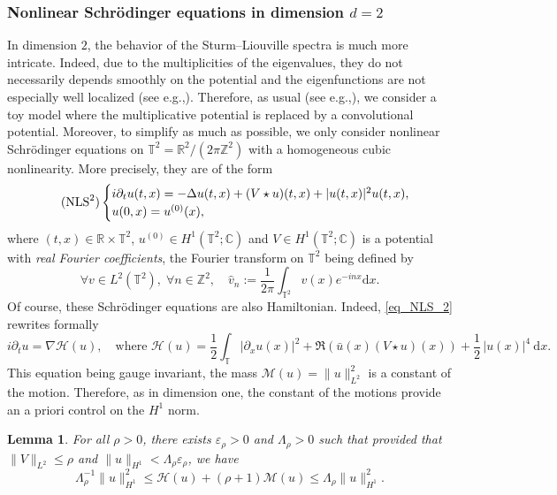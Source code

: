 \documentclass[11pt]{article}
\newcommand{\eg}{e.g.,\xspace}
\newtheorem{lemma}[theorem]{Lemma}
\theoremstyle{definition}
\begin{document}
\subsubsection{Nonlinear Schrödinger equations in dimension $d=2$}
\label{sub_sec_NLS2}
In dimension $2$, the behavior of the Sturm--Liouville spectra is much more intricate. Indeed, due to the multiplicities of the eigenvalues, they do not necessarily depends smoothly on the potential and the eigenfunctions are not especially well localized (see \eg \cite{BB13}). Therefore, as usual (see \eg \cite{BG06,FI19,BMP20}), we consider a toy model where the multiplicative potential is replaced by a convolutional potential. Moreover, to simplify as much as possible, we only consider nonlinear Schrödinger equations on $\mathbb{T}^2 = \mathbb{R}^2 / (2\pi \mathbb{Z}^2)$ with a homogeneous cubic nonlinearity. More precisely, they are of the form
\begin{equation}
\label{eq_NLS_2}
\tag{$\mathrm{NLS}^2$}
\begin{cases}
i\partial_t u(t,x) = -\Delta u(t,x) +(V \star u)(t,x) + |u(t,x)|^2 u(t,x), \\
u(0,x) = u^{(0)}(x),
\end{cases}
\end{equation}
where $(t,x)\in \mathbb{R}\times\mathbb{T}^2$, $u^{(0)}\in H^1(\mathbb{T}^2;\mathbb{C})$ and $V \in H^1(\mathbb{T}^2 ; \mathbb{C})$ is a potential with \emph{real Fourier coefficients}, the Fourier transform on $\mathbb{T}^2$ being defined by
\[
\forall v\in L^2(\mathbb{T}^2),\;\forall n \in \mathbb{Z}^2, \quad \widehat{v}_n:= \frac1{2\pi} \int_{\mathbb{T}^2} v(x) e^{-inx}\mathrm{d}x.
\]
Of course, these Schrödinger equations are also Hamiltonian. Indeed, \eqref{eq_NLS_2} rewrites formally
\[
i\partial_t u = \nabla \mathcal{H}(u), \quad \text{where } \mathcal{H}(u) =\frac12 \int_{\mathbb{T}} |\partial_x u(x) |^2 + \Re (\bar{u}(x)(V \star u)(x)) + \frac12\, |u(x)|^4 \ \mathrm{d}x.
\]
This equation being gauge invariant, the mass $\mathcal{M}(u) = \|u\|_{L^2}^2$ is a constant of the motion. Therefore, as in dimension one, the constant of the motions provide an a priori control on the $H^1$ norm.
\begin{lemma} \label{lemma_Lag_NLS_coer_2d} For all $\rho>0$, there exists $\varepsilon_\rho >0$ and $\Lambda_\rho>0$ such that provided that $\| V \|_{L^2} \leq \rho$ and $\|u\|_{H^1} < \Lambda_\rho \varepsilon_\rho$, we have
\[
\Lambda_{\rho}^{-1} \| u\|_{H^1}^2 \leq \mathcal{H}(u) + (\rho+1) \mathcal{M}(u) \leq \Lambda_{\rho} \| u\|_{H^1}^2.
\]
\end{lemma}
\end{document}
